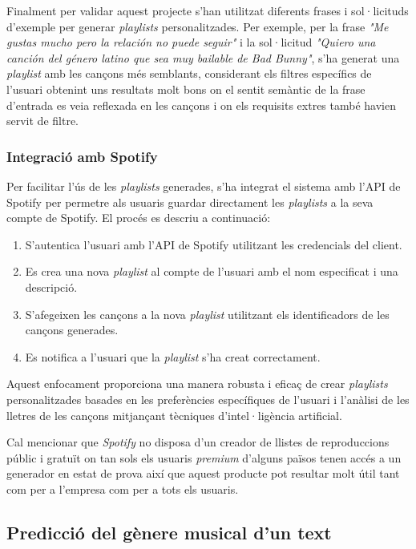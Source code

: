 Finalment per validar aquest projecte s'han utilitzat diferents frases i sol·licituds d'exemple per generar \textit{playlists} personalitzades. Per exemple, per la frase \textit{"Me gustas mucho pero la relación no puede seguir"} i la sol·licitud \textit{"Quiero una canción del género latino que sea muy bailable de Bad Bunny"}, s'ha generat una \textit{playlist} amb les cançons més semblants, considerant els filtres específics de l'usuari obtenint uns resultats molt bons on el sentit semàntic de la frase d'entrada es veia reflexada en les cançons i on els requisits extres també havien servit de filtre.

\subsubsection{Integració amb Spotify}

Per facilitar l'ús de les \textit{playlists} generades, s'ha integrat el sistema amb l'API de Spotify per permetre als usuaris guardar directament les \textit{playlists} a la seva compte de Spotify. El procés es descriu a continuació:

\begin{enumerate}
    \item S'autentica l'usuari amb l'API de Spotify utilitzant les credencials del client.
    \item Es crea una nova \textit{playlist} al compte de l'usuari amb el nom especificat i una descripció.
    \item S'afegeixen les cançons a la nova \textit{playlist} utilitzant els identificadors de les cançons generades.
    \item Es notifica a l'usuari que la \textit{playlist} s'ha creat correctament.
\end{enumerate}

Aquest enfocament proporciona una manera robusta i eficaç de crear \textit{playlists} personalitzades basades en les preferències específiques de l'usuari i l'anàlisi de les lletres de les cançons mitjançant tècniques d'intel·ligència artificial. 

Cal mencionar que \textit{Spotify} no disposa d'un creador de llistes de reproduccions públic i gratuït on tan sols els usuaris \textit{premium} d'alguns països tenen accés a un generador en estat de prova així que aquest producte pot resultar molt útil tant com per a l'empresa com per a tots els usuaris.

\subsection{Predicció del gènere musical d'un text}

